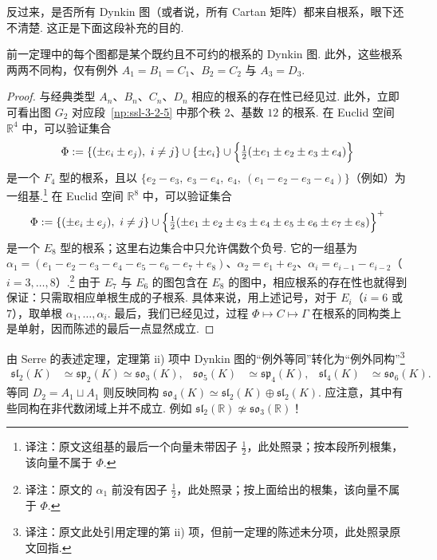 反过来，是否所有 Dynkin 图（或者说，所有 Cartan 矩阵）都来自根系，眼下还不清楚. 这正是下面这段补充的目的.
\begin{theorem}\label{thm:ssl-3-4-5}
前一定理中的每个图都是某个既约且不可约的根系的 Dynkin 图. 此外，这些根系两两不同构，仅有例外 $A_1=B_1=C_1$、$B_2=C_2$ 与 $A_3=D_3$.
\end{theorem}
\begin{proof}
与经典类型 $A_n$、$B_n$、$C_n$、$D_n$ 相应的根系的存在性已经见过. 此外，立即可看出图 $G_2$ 对应段~\ref{np:ssl-3-2-5} 中那个秩 $2$、基数 $12$ 的根系. 在 Euclid 空间 $\mathbb{R}^4$ 中，可以验证集合
\[\Phi:=\{(\pm e_i\pm e_j),\ i\neq j\}\cup\{\pm e_i\}\cup\Bigl\{\tfrac{1}{2}(\pm e_1\pm e_2\pm e_3\pm e_4)\Bigr\}\]
是一个 $F_4$ 型的根系，且以 $\{e_2-e_3,\ e_3-e_4,\ e_4,\ (e_1-e_2-e_3-e_4)\}$（例如）为一组基.\footnote{译注：原文这组基的最后一个向量未带因子 $\tfrac12$，此处照录；按本段所列根集，该向量不属于 $\Phi$.}
在 Euclid 空间 $\mathbb{R}^8$ 中，可以验证集合
\begin{align*}
\Phi:=\{(\pm e_i\pm e_j),\ i\neq j\}\cup\Bigl\{\tfrac12(\pm e_1\pm e_2\pm e_3\pm e_4\pm e_5\pm e_6\pm e_7\pm e_8)\Bigr\}^{+}
\end{align*}
是一个 $E_8$ 型的根系；这里右边集合中只允许偶数个负号. 它的一组基为 $\alpha_1=(e_1-e_2-e_3-e_4-e_5-e_6-e_7+e_8)$、$\alpha_2=e_1+e_2$、$\alpha_i=e_{i-1}-e_{i-2}$（$i=3,\ldots,8$）.\footnote{译注：原文的 $\alpha_1$ 前没有因子 $\tfrac12$，此处照录；按上面给出的根集，该向量不属于 $\Phi$.}
由于 $E_7$ 与 $E_6$ 的图包含在 $E_8$ 的图中，相应根系的存在性也就得到保证：只需取相应单根生成的子根系. 具体来说，用上述记号，对于 $E_i$（$i=6$ 或 $7$），取单根 $\alpha_1,\ldots,\alpha_i$.
最后，我们已经见过，过程 $\Phi\mapsto C\mapsto\Gamma$ 在根系的同构类上是单射，因而陈述的最后一点显然成立.
\end{proof}
\begin{remark*}
由 Serre 的表述定理，定理第 ii) 项中 Dynkin 图的``例外等同''转化为``例外同构''\footnote{译注：原文此处引用定理的第 ii) 项，但前一定理的陈述未分项，此处照录原文回指.}
\begin{align*}
\mathfrak{sl}_2(K)&\simeq\mathfrak{sp}_2(K)\simeq\mathfrak{so}_3(K),&
\mathfrak{so}_5(K)&\simeq\mathfrak{sp}_4(K),&
\mathfrak{sl}_4(K)&\simeq\mathfrak{so}_6(K).
\end{align*}
等同 $D_2=A_1\sqcup A_1$ 则反映同构 $\mathfrak{so}_4(K)\simeq\mathfrak{sl}_2(K)\oplus\mathfrak{sl}_2(K)$. 应注意，其中有些同构在非代数闭域上并不成立. 例如 $\mathfrak{sl}_2(\mathbb{R})\not\simeq\mathfrak{so}_3(\mathbb{R})$！
\end{remark*}
